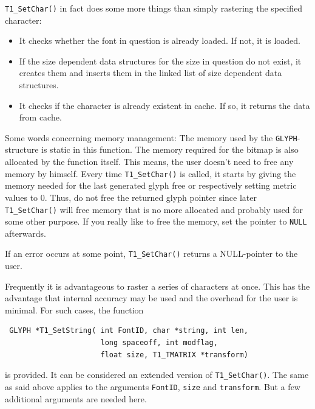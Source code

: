 \verb+T1_SetChar()+ in fact does some more things than simply
rastering the specified character:
\begin{itemize}
\item It checks whether the font in question is already loaded. If not,
  it is loaded. 
\item If the size dependent data structures for the size in question
  do not exist, it creates them and inserts them in the linked list of
  size dependent data structures.
\item It checks if the character is already existent in cache. If so,
  it returns the data from cache.
\end{itemize}

Some words concerning memory management: The memory used by
the \verb+GLYPH+-structure is static in this function. The memory
required for the bitmap is also allocated by the function itself.
This means, the user doesn't need to free any memory by
himself. Every time \verb+T1_SetChar()+ is called, it starts by giving the
memory needed for the last generated glyph free or respectively
setting metric values to 0. Thus, do not free the
returned glyph pointer since later \verb+T1_SetChar()+ will free
memory that is no more allocated and probably used for some other purpose.
If you really like to free the memory, set the pointer to \verb+NULL+
afterwards. 

If an error occurs at some point, \verb+T1_SetChar()+ returns a
NULL-pointer to the user.

Frequently it is advantageous to raster a series of
characters at once. This has the advantage that internal accuracy may
be used and the overhead for the user is minimal. For such cases, the
function 
\precorr
\begin{verbatim}
 GLYPH *T1_SetString( int FontID, char *string, int len, 
                      long spaceoff, int modflag, 
                      float size, T1_TMATRIX *transform)
\end{verbatim}\postcorr
is provided.
It can be considered an extended version of \verb+T1_SetChar()+. The
same as said above applies to the arguments \verb+FontID+,
\verb+size+ and \verb+transform+. But a few additional arguments are
needed here. 

